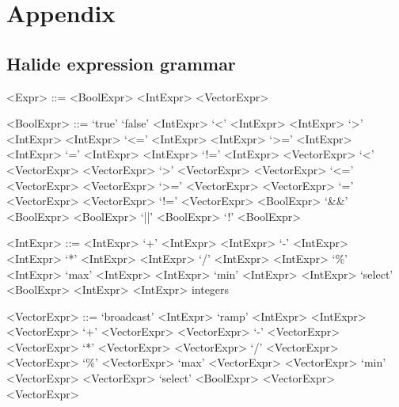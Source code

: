 \documentclass[acmsmall,review,anonymous]{acmart}\settopmatter{printfolios=true,printccs=false,printacmref=false}
\begin{document}


\maketitle

\appendix
\section{Appendix}

\subsection{Halide expression grammar}
\label{ss:appendixA}


\begin{grammar}
<Expr> ::= <BoolExpr> 
\alt <IntExpr> 
\alt <VectorExpr>

<BoolExpr> ::= `true'
\alt `false'
\alt <IntExpr> `<' <IntExpr>
\alt <IntExpr> `>' <IntExpr>
\alt <IntExpr> `<=' <IntExpr>
\alt <IntExpr> `>=' <IntExpr>
\alt <IntExpr> `=' <IntExpr>
\alt <IntExpr> `!=' <IntExpr>
\alt <VectorExpr> `<' <VectorExpr>
\alt <VectorExpr> `>' <VectorExpr>
\alt <VectorExpr> `<=' <VectorExpr>
\alt <VectorExpr> `>=' <VectorExpr>
\alt <VectorExpr> `=' <VectorExpr>
\alt <VectorExpr> `!=' <VectorExpr>
\alt <BoolExpr> `&&' <BoolExpr>
\alt <BoolExpr> `||' <BoolExpr>
\alt `!' <BoolExpr>

<IntExpr> ::= <IntExpr> `+' <IntExpr>
\alt <IntExpr> `-' <IntExpr>
\alt <IntExpr> `*' <IntExpr>
\alt <IntExpr> `/' <IntExpr>
\alt <IntExpr> `\%' <IntExpr>
\alt `max' <IntExpr> <IntExpr>
\alt `min' <IntExpr> <IntExpr>
\alt `select' <BoolExpr> <IntExpr> <IntExpr>
\alt integers

<VectorExpr> ::= `broadcast' <IntExpr>
\alt `ramp' <IntExpr> <IntExpr>
\alt <VectorExpr> `+' <VectorExpr>
\alt <VectorExpr> `-' <VectorExpr>
\alt <VectorExpr> `*' <VectorExpr>
\alt <VectorExpr> `/' <VectorExpr>
\alt <VectorExpr> `\%' <VectorExpr>
\alt `max' <VectorExpr> <VectorExpr>
\alt `min' <VectorExpr> <VectorExpr>
\alt `select' <BoolExpr> <VectorExpr> <VectorExpr>
\end{grammar}
\end{document}
